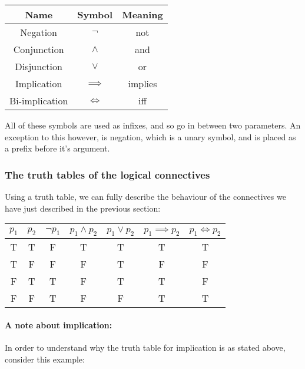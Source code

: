 \documentclass{article}
\begin{document}

\begin{center}
	\begin{tabular}{|c|c|c|}
		\hline
		Name & Symbol & Meaning\\ \hline
		Negation		&	$\neg$		& not\\
		Conjunction		&	$\wedge$	& and\\
		Disjunction		&	$\vee$		& or\\
		Implication		&	$\implies$	& implies\\
		Bi-implication	&	$\iff$		& iff\\
		\hline
	\end{tabular}
\end{center}

All of these symbols are used as infixes, and so go in between two parameters. An
exception to this however, is negation, which is a unary symbol, and is placed
as a prefix before it's argument.

\subsubsection{The truth tables of the logical connectives}

Using a truth table, we can fully describe the behaviour of the connectives we
have just described in the previous section:

\begin{center}
	\begin{tabular}{|c|c|c|c|c|c|c|}
		\hline
		$p_1$& $p_2$& $\neg p_1$& $p_1 \wedge p_2$& $p_1 \vee p_2$& $p_1 \implies p_2$& $p_1 \iff p_2$\\ \hline
		T& T& F& T &T &T &T\\
		T& F& F& F &T &F &F\\
		F& T& T& F &T &T &F\\
		F& F& T& F &F &T &T\\ \hline
	\end{tabular}
\end{center}

\paragraph{A note about implication:}
In order to understand why the truth table for implication is as stated above,
consider this example:
\end{document}
